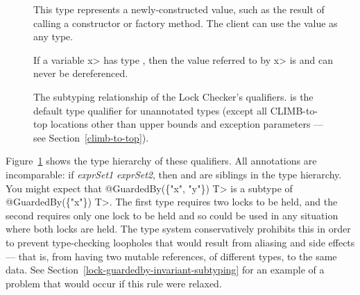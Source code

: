 \begin{description}
\item[]
  This type represents a newly-constructed value, such as the result of
  calling a constructor or factory method.  The client can use the value as
  any  type.

\item[]
  If a variable \<x> has type , then
  the value referred to by \<x> is  and can never
  be dereferenced.

\end{description}

\begin{figure}
\caption{The subtyping relationship of the Lock Checker's qualifiers.
 is the default type qualifier for unannotated
types (except all CLIMB-to-top locations other than upper bounds and exception
parameters --- see Section~\ref{climb-to-top}).
}
\label{fig-lock-guardedby-hierarchy}
\end{figure}

Figure~\ref{fig-lock-guardedby-hierarchy} shows the type hierarchy of these
qualifiers.
All  annotations are incomparable:
if \emph{exprSet1} \neqsym{} \emph{exprSet2}, then  and
 are siblings in the type hierarchy.
You might expect that
\<@GuardedBy(\{"x", "y"\}) T> is a subtype of \<@GuardedBy(\{"x"\}) T>.  The
first type requires two locks to be held, and the second requires only one
lock to be held and so could be used in any situation where both locks are
held.  The type system conservatively prohibits this in order to prevent
type-checking loopholes that would result from aliasing and side effects
--- that is, from having two mutable references, of different types, to the
same data. See
Section~\ref{lock-guardedby-invariant-subtyping} for an example
of a problem that would occur if this rule were relaxed.




